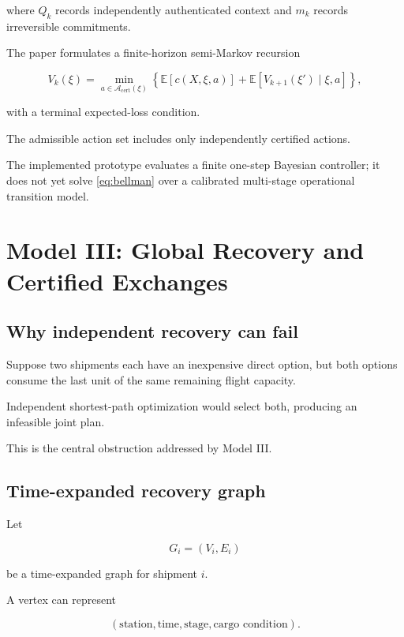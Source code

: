 \documentclass[10pt,a4paper]{article}
\newcommand{\EE}{\mathbb{E}}
\theoremstyle{plain}
\theoremstyle{definition}
\theoremstyle{remark}
\begin{document}
where \(Q_k\) records independently
authenticated context and \(m_k\)
records irreversible commitments.

The paper formulates a finite-horizon
semi-Markov recursion

\begin{equation}
V_k(\xi)=
\min_{a\in\mathcal A_{\mathrm{cert}}(\xi)}
\left\{
\EE[c(X,\xi,a)]
+
\EE\!\left[
V_{k+1}(\xi')
\mid \xi,a
\right]
\right\},
\label{eq:bellman}
\end{equation}

with a terminal expected-loss condition.

The admissible action set includes only
independently certified actions.

The implemented prototype evaluates a
finite one-step Bayesian controller;
it does not yet solve
\eqref{eq:bellman} over a calibrated
multi-stage operational transition model.

\section{Model III: Global Recovery and Certified Exchanges}

\subsection{Why independent recovery can fail}

Suppose two shipments each have
an inexpensive direct option,
but both options consume the last
unit of the same remaining flight capacity.

Independent shortest-path optimization
would select both, producing an
infeasible joint plan.

This is the central obstruction
addressed by Model III.

\subsection{Time-expanded recovery graph}

Let

\[
G_i=(V_i,E_i)
\]

be a time-expanded graph for shipment \(i\).

A vertex can represent

\[
(\text{station},\text{time},
\text{stage},\text{cargo condition}).
\]
\end{document}
